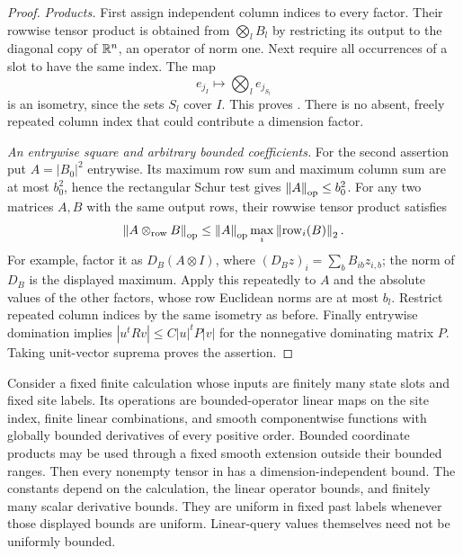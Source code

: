 \begin{proof}
\emph{Products.}
First assign independent column indices to every factor.  Their rowwise
tensor product is obtained from $\bigotimes_lB_l$ by restricting its
output to the diagonal copy of $\mathbb R^n$, an operator of norm one.
Next require all occurrences of a slot to have the same index.  The
map
\[
 e_{j_I}\longmapsto\bigotimes_l e_{j_{S_l}}
\]
is an isometry, since the sets $S_l$ cover $I$.  This proves
.  There is no absent, freely repeated
column index that could contribute a dimension factor.

\emph{An entrywise square and arbitrary bounded coefficients.}
For the second assertion put $A=|B_0|^2$ entrywise.  Its maximum row
sum and maximum column sum are at most $b_0^2$, hence the rectangular
Schur test gives $\left\lVert A\right\rVert_{\mathrm{op}}\le b_0^2$.
For any two matrices $A,B$ with the same output rows, their rowwise
tensor product satisfies
\[
 \left\lVert A\otimes_{\rm row}B\right\rVert_{\mathrm{op}}
 \le\left\lVert A\right\rVert_{\mathrm{op}}\max_i\left\lVert \operatorname{row}_i(B)\right\rVert_2.
\]
For example, factor it as $D_B(A\otimes I)$, where
$(D_Bz)_i=\sum_b B_{ib}z_{i,b}$; the norm of $D_B$ is the displayed
maximum.  Apply this repeatedly to $A$ and the absolute values of the
other factors, whose row Euclidean norms are at most $b_l$.
Restrict repeated column indices by the same isometry as before.
Finally entrywise domination implies
$|u^tRv|\le C|u|^tP|v|$ for the nonnegative dominating matrix $P$.
Taking unit-vector suprema proves the assertion.
\end{proof}

\begin{lemma}
\label{lem:path-mixed-tensors}
Consider a fixed finite calculation whose inputs are finitely many
state slots and fixed site labels.  Its operations are bounded-operator
linear maps on the site index, finite linear combinations, and smooth
componentwise functions with globally bounded derivatives of every
positive order.  Bounded coordinate products may be used through a
fixed smooth extension outside their bounded ranges.  Then every
nonempty tensor in  has a dimension-independent
bound.  The constants depend on the calculation, the linear operator
bounds, and finitely many scalar derivative bounds.  They are uniform
in fixed past labels whenever those displayed bounds are uniform.
Linear-query values themselves need not be uniformly bounded.
\end{lemma}

